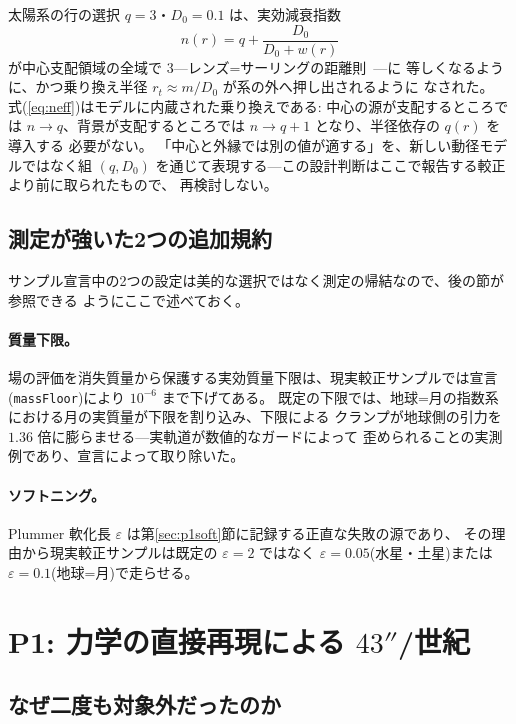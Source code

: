 \documentclass[a4paper,10pt,twocolumn]{ltjsarticle}
\begin{document}
太陽系の行の選択 $q=3$・$D_0=0.1$ は、実効減衰指数
\begin{equation}
  n(r) = q+\frac{D_0}{D_0+w(r)}
  \label{eq:neff}
\end{equation}
が中心支配領域の全域で $3$---レンズ=サーリングの距離則~\cite{LenseThirring1918}---に
等しくなるように、かつ乗り換え半径 $r_t\approx m/D_0$ が系の外へ押し出されるように
なされた。
式(\ref{eq:neff})はモデルに内蔵された乗り換えである: 中心の源が支配するところでは
$n\to q$、背景が支配するところでは $n\to q+1$ となり、半径依存の $q(r)$ を導入する
必要がない。
「中心と外縁では別の値が適する」を、新しい動径モデルではなく組
$(q,D_0)$ を通じて表現する---この設計判断はここで報告する較正より前に取られたもので、
再検討しない。

\subsection{測定が強いた2つの追加規約}
\label{sec:forced}

サンプル宣言中の2つの設定は美的な選択ではなく測定の帰結なので、後の節が参照できる
ようにここで述べておく。

\paragraph*{質量下限。}
場の評価を消失質量から保護する実効質量下限は、現実較正サンプルでは宣言
(\texttt{massFloor})により $10^{-6}$ まで下げてある。
既定の下限では、地球=月の指数系における月の実質量が下限を割り込み、下限による
クランプが地球側の引力を $1.36$ 倍に膨らませる---実軌道が数値的なガードによって
歪められることの実測例であり、宣言によって取り除いた。

\paragraph*{ソフトニング。}
Plummer 軟化長 $\varepsilon$ は第\ref{sec:p1soft}節に記録する正直な失敗の源であり、
その理由から現実較正サンプルは既定の $\varepsilon=2$ ではなく
$\varepsilon=0.05$(水星・土星)または $\varepsilon=0.1$(地球=月)で走らせる。

\section{P1: 力学の直接再現による \texorpdfstring{$43''$}{43秒}/世紀}
\label{sec:p1}

\subsection{なぜ二度も対象外だったのか}
\label{sec:p1history}
\end{document}

